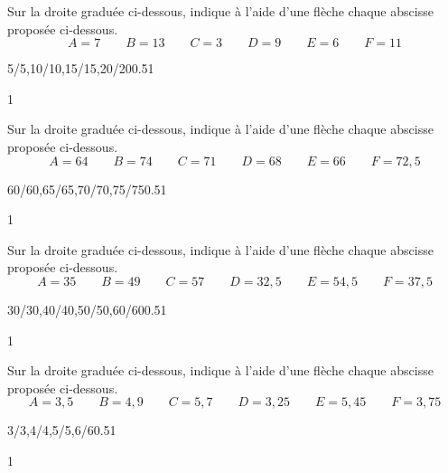 \documentclass[a4paper,11pt]{report}
\begin{document}
\begin{exop}{
Sur la droite graduée ci-dessous, indique à l'aide d'une flèche chaque abscisse proposée ci-dessous.
$$A=7\qquad B=13\qquad C=3\qquad D=9 \qquad E= 6 \qquad F=11$$
\begin{center}
\begin{numberlined}{5}{20}{5}{1}{5/5,10/10,15/15,20/20}{0.5}{1}{}
\end{numberlined}
\end{center}

}{1}\end{exop}

\begin{exop}{
Sur la droite graduée ci-dessous, indique à l'aide d'une flèche chaque abscisse proposée ci-dessous.
$$A=64\qquad B=74\qquad C=71\qquad D=68 \qquad E= 66 \qquad F=72,5$$
\begin{center}
\begin{numberlined}{60}{75}{5}{1}{60/60,65/65,70/70,75/75}{0.5}{1}{}
\end{numberlined}
\end{center}

}{1}\end{exop}

\begin{exop}{
Sur la droite graduée ci-dessous, indique à l'aide d'une flèche chaque abscisse proposée ci-dessous.
$$A=35\qquad B=49\qquad C=57\qquad D=32,5 \qquad E= 54,5 \qquad F=37,5$$
\begin{center}
\begin{numberlined}{30}{60}{10}{1}{30/30,40/40,50/50,60/60}{0.5}{1}{}
\end{numberlined}
\end{center}

}{1}\end{exop}



\begin{exop}{
Sur la droite graduée ci-dessous, indique à l'aide d'une flèche chaque abscisse proposée ci-dessous.
$$A=3,5\qquad B=4,9\qquad C=5,7\qquad D=3,25 \qquad E= 5,45 \qquad F=3,75$$
\begin{center}
\begin{numberlined}{3}{6}{1}{0.5}{3/3,4/4,5/5,6/6}{0.5}{1}{}
\end{numberlined}
\end{center}
}{1}\end{exop}
\end{document}
